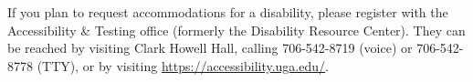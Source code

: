 If you plan to request accommodations for a disability, please register with the Accessibility \& Testing office (formerly the Disability Resource Center). They can be reached by visiting Clark Howell Hall, calling 706-542-8719 (voice) or 706-542-8778 (TTY), or by visiting \href{https://accessibility.uga.edu/}{https://accessibility.uga.edu/}.
